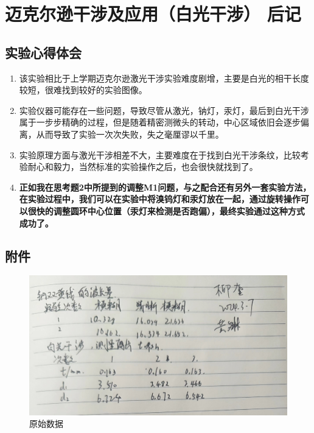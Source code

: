 \documentclass[dvipsnames, svgnames,a4paper,11pt]{article}
\begin{document}
	

	
	\section{迈克尔逊干涉及应用（白光干涉） \quad\heiti  后记}
	
	\subsection{实验心得体会}
	\begin{enumerate}
		\item 该实验相比于上学期迈克尔逊激光干涉实验难度剧增，主要是白光的相干长度较短，很难找到较好的实验图像。
		\item 实验仪器可能存在一些问题，导致尽管从激光，钠灯，汞灯，最后到白光干涉属于一步步精确的过程，但是随着精密测微头的转动，中心区域依旧会逐步偏离，从而导致了实验一次次失败，失之毫厘谬以千里。
		\item 实验原理方面与激光干涉相差不大，主要难度在于找到白光干涉条纹，比较考验耐心和毅力，当然标准的实验操作之后，也会很快就找到了。
		\item\textbf{ 正如我在思考题2中所提到的调整M1问题，与之配合还有另外一套实验方法，在实验过程中，我们可以在实验中将溴钨灯和汞灯放在一起，通过旋转操作可以很快的调整圆环中心位置（汞灯来检测是否跑偏），最终实验通过这种方式成功了。}
	\end{enumerate}

	\subsection{附件}
	\begin{figure}[H]
		\centering
		\includegraphics[width=0.2\linewidth]{images/数据}
		\caption{原始数据}
		\label{fig:}
	\end{figure}
	
	
	
\end{document}
